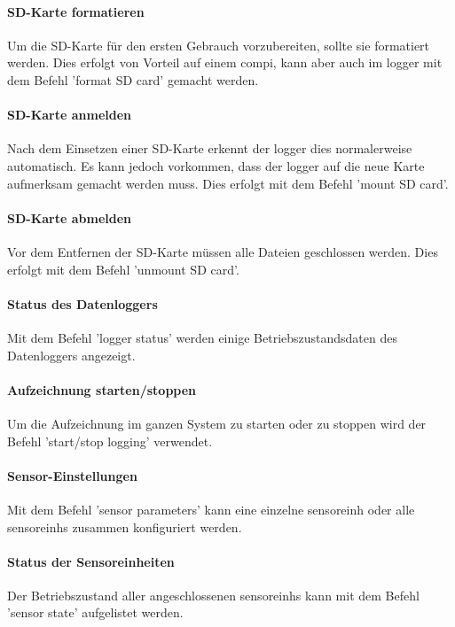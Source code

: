 \paragraph{SD-Karte formatieren} Um die SD-Karte für den ersten Gebrauch vorzubereiten, sollte sie formatiert werden. Dies erfolgt von Vorteil auf einem \gls{compi}, kann aber auch im \gls{logger} mit dem Befehl 'format SD card' gemacht werden.

\paragraph{SD-Karte anmelden} Nach dem Einsetzen einer SD-Karte erkennt der \gls{logger} dies normalerweise automatisch. Es kann jedoch vorkommen, dass der \gls{logger} auf die neue Karte aufmerksam gemacht werden muss. Dies erfolgt mit dem Befehl 'mount SD card'.

\paragraph{SD-Karte abmelden} Vor dem Entfernen der SD-Karte müssen alle Dateien geschlossen werden. Dies erfolgt mit dem Befehl 'unmount SD card'.

\paragraph{Status des Datenloggers} Mit dem Befehl 'logger status' werden einige Betriebszustandsdaten des Datenloggers angezeigt.

\paragraph{Aufzeichnung starten/stoppen} Um die Aufzeichnung im ganzen System zu starten oder zu stoppen wird der Befehl 'start/stop logging' verwendet.

\paragraph{Sensor-Einstellungen} Mit dem Befehl 'sensor parameters' kann eine einzelne \gls{sensoreinh} oder alle \glspl{sensoreinh} zusammen konfiguriert werden.

\paragraph{Status der Sensoreinheiten} Der Betriebszustand aller angeschlossenen \glspl{sensoreinh} kann mit dem Befehl 'sensor state' aufgelistet werden.

